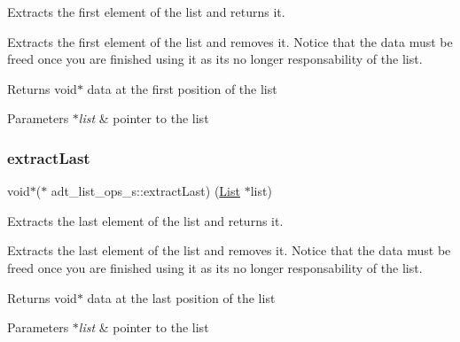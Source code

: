 Extracts the first element of the list and returns it. 

Extracts the first element of the list and removes it. Notice that the data must be freed once you are finished using it as it\textquotesingle{}s no longer responsability of the list.

\begin{DoxyReturn}{Returns}
void$\ast$ data at the first position of the list 
\end{DoxyReturn}

\begin{DoxyParams}{Parameters}
{\em $\ast$list} & pointer to the list \\
\hline
\end{DoxyParams}
\mbox{\label{structadt__list__ops__s_a2131ab9f32ed3afbca20adb0e22e1876}} 
\subsubsection{\texorpdfstring{extract\+Last}{extractLast}}
{\footnotesize\ttfamily void$\ast$($\ast$ adt\+\_\+list\+\_\+ops\+\_\+s\+::extract\+Last) (\hyperlink{structadt__list__s}{List} $\ast$list)}



Extracts the last element of the list and returns it. 

Extracts the last element of the list and removes it. Notice that the data must be freed once you are finished using it as it\textquotesingle{}s no longer responsability of the list.

\begin{DoxyReturn}{Returns}
void$\ast$ data at the last position of the list 
\end{DoxyReturn}

\begin{DoxyParams}{Parameters}
{\em $\ast$list} & pointer to the list \\
\hline
\end{DoxyParams}
\mbox{\label{structadt__list__ops__s_af5265c760ad4f404e7355b32e439ff2d}} 
